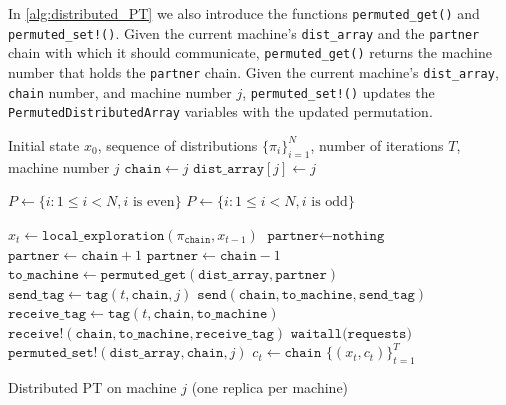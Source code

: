 \medskip 
In \cref{alg:distributed_PT} we also introduce the functions 
\texttt{permuted\_get()} and \texttt{permuted\_set!()}. 
Given the current machine's \texttt{dist\_array} and the 
\texttt{partner} chain with which it should communicate, 
\texttt{permuted\_get()} returns the machine number that holds the \texttt{partner} chain. 
Given the current machine's \texttt{dist\_array}, \texttt{chain} number, and machine number $j$,
\texttt{permuted\_set!()} updates the \texttt{PermutedDistributedArray} variables 
with the updated permutation.

\begin{algorithm}[t]
	\begin{algorithmic}[1]
    \Require Initial state $x_0$, sequence of distributions $\{\pi_i\}_{i=1}^N$, 
      number of iterations $T$, machine number $j$
    \State $\texttt{chain} \gets j$ 
    \State $\texttt{dist\_array}[j] \gets j$ 
		
		   
		    \State $P \gets \{i: 1 \le i < N, i \text{ is even} \}$
		  \Else
		    \State $P \gets \{i: 1 \le i < N, i \text{ is odd} \}$
		  \EndIf

      \State $x_t \gets \texttt{local\_exploration}(\pi_\texttt{chain}, x_{t-1})$
      \State $\texttt{partner} \gets \texttt{nothing}$
        \State $\texttt{partner} \gets \texttt{chain}+1$
        \State $\texttt{partner} \gets \texttt{chain}-1$
      \EndIf
        \State $\texttt{to\_machine} \gets \texttt{permuted\_get}(\texttt{dist\_array}, \texttt{partner})$
        \State $\texttt{send\_tag} \gets \texttt{tag}(t, \texttt{chain}, j)$
        \State $\texttt{send}(\texttt{chain}, \texttt{to\_machine}, \texttt{send\_tag})$
        \State $\texttt{receive\_tag} \gets \texttt{tag}(t, \texttt{chain}, \texttt{to\_machine})$
        \State $\texttt{receive!}(\texttt{chain}, \texttt{to\_machine}, \texttt{receive\_tag})$
        \State $\texttt{waitall(requests)}$ 
        \State $\texttt{permuted\_set!}(\texttt{dist\_array}, \texttt{chain}, j)$
      \EndIf
      \State $c_t \gets \texttt{chain}$ 
		\EndFor
    \State \Return $\{(x_t, c_t)\}_{t=1}^T$
	\end{algorithmic}
  \caption{Distributed PT on machine $j$ (one replica per machine)}
  \label{alg:distributed_PT}
\end{algorithm}
